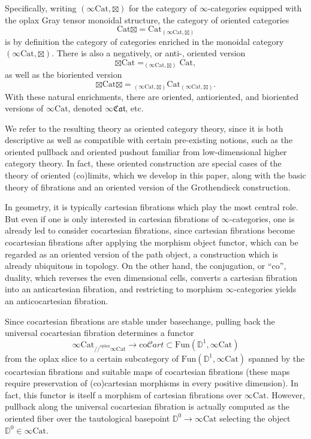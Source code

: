 \documentclass[10pt,oneside]{article}
\numberwithin{equation}{section} %
\numberwithin{figure}{section} %
\theoremstyle{plain}
\theoremstyle{definition}
\newcommand{\bD}{{\mathbb D}}
\newcommand{\co}{\mathrm{co}}
\newcommand{\Cat}{\mathrm{Cat}}
\newcommand{\Fun}{\mathrm{Fun}}
\newcommand{\oplax}{{\mathrm{oplax}}}
\newcommand{\fcat}{\mathfrak{Cat}}
\begin{document}
Specifically, writing $(\infty\Cat,\boxtimes)$ for the category of $\infty$-categories equipped with the oplax Gray tensor monoidal structure, the category of oriented categories
\[
\Cat\boxtimes =\Cat_{(\infty\Cat,\boxtimes)}
\]
is by definition the category of categories enriched in the monoidal category $(\infty\Cat,\boxtimes)$.
There is also a negatively, or anti-, oriented version
\[
\boxtimes\Cat = _{(\infty\Cat,\boxtimes)}\Cat,
\]
as well as the bioriented version
\[
\boxtimes\Cat\boxtimes = {_{(\infty\Cat,\boxtimes)}\Cat_{(\infty\Cat,\boxtimes)}}.
\]
With these natural enrichments, there are oriented, antioriented, and bioriented versions of $\infty\Cat$, denoted $\infty\fcat$, etc.


We refer to the resulting theory as oriented category theory, since it is both descriptive as well as compatible with certain pre-existing notions, such as the oriented pullback and oriented pushout familiar from low-dimensional higher category theory.
In fact, these oriented construction are special cases of the theory of oriented (co)limits, which we develop in this paper, along with the basic theory of fibrations and an oriented version of the Grothendieck construction.


In geometry, it is typically cartesian fibrations which play the most central role.
But even if one is only interested in cartesian fibrations of $\infty$-categories, one is already led to consider cocartesian fibrations, since cartesian fibrations become cocartesian fibrations after applying the morphism object functor, which can be regarded as an oriented version of the path object, a construction which is already ubiquitous in topology.
On the other hand, the conjugation, or ``co'', duality, which reverses the even dimensional cells, converts a cartesian fibration into an anticartesian fibration, and restricting to morphism $\infty$-categories yields an anticocartesian fibration.

Since cocartesian fibrations are stable under basechange, pulling back the universal cocartesian fibration determines a functor 
\[
\infty{\Cat}_{//^{\oplax}\infty\Cat}\to\co\mathcal{C}\mathit{art}\subset\Fun(\bD^1,\infty\Cat)
\]
from the oplax slice to a certain subcategory of $\Fun(\bD^1,\infty\Cat)$ spanned by the cocartesian fibrations and suitable maps of cocartesian fibrations (these maps require preservation of (co)cartesian morphisms in every positive dimension).
In fact, this functor is itself a morphism of cartesian fibrations over $\infty\Cat$.
However, pullback along the universal cocartesian fibration is actually computed as the oriented fiber over the tautological basepoint $\bD^0\to\infty\Cat$ selecting the object $\bD^0\in\infty\Cat$.
\end{document}
